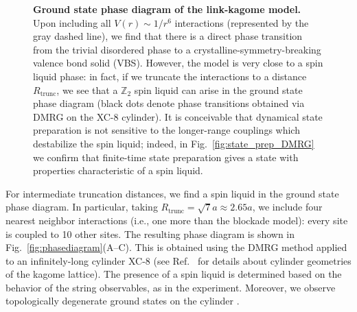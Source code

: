 \documentclass[twocolumn,amssymb,secnumarabic, prl, aps, nofootinbib]{revtex4-1}
\begin{document}
\begin{figure}
    \centering
    \caption{\textbf{Ground state phase diagram of the link-kagome model.} Upon including all $V(r) \sim 1/r^6$ interactions (represented by the gray dashed line), we find that there is a direct phase transition from the trivial disordered phase to a crystalline-symmetry-breaking valence bond solid (VBS). However, the model is very close to a spin liquid phase: in fact, if we truncate the interactions to a distance $R_\textrm{trunc}$, we see that a $\mathbb Z_2$ spin liquid can arise in the ground state phase diagram (black dots denote phase transitions obtained via DMRG on the XC-8 cylinder). It is conceivable that dynamical state preparation is not sensitive to the longer-range couplings which destabilize the spin liquid; indeed, in Fig.~\ref{fig:state_prep_DMRG} we confirm that finite-time state preparation gives a state with properties characteristic of a spin liquid. 
    }
    \label{fig:gsphasediagram}
\end{figure}

For intermediate truncation distances, we find a spin liquid in the ground state phase diagram. In particular, taking $R_\textrm{trunc} = \sqrt{7}a\approx 2.65a$, we include four nearest neighbor interactions (i.e., one more than the blockade model): every site is coupled to 10 other sites. The resulting phase diagram is shown in Fig.~\ref{fig:phasediagram}(A--C). This is obtained using the DMRG method applied to an infinitely-long cylinder XC-8 (see Ref.~\cite{Ruben2020} for details about cylinder geometries of the kagome lattice). The presence of a spin liquid is determined based on the behavior of the string observables, as in the experiment. Moreover, we observe topologically degenerate ground states on the cylinder \cite{Ruben2020}.
\end{document}

